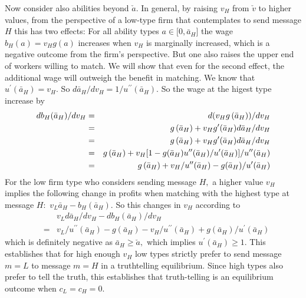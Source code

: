 \documentclass[12pt]{article}
\theoremstyle{plain}
\begin{document}
Now consider also abilities beyond $\check{a}.$ In general, by raising $%
v_{H} $ from $\check{v}$ to higher values, from the perspective of a
low-type firm that contemplates to send message $H$ this has two effects:
For all ability types $a\in \lbrack 0,\bar{a}_{H}]$ the wage $%
b_{H}(a)=v_{H}g(a)$ increases when $v_{H}$ is marginally increased, which is
a negative outcome from the firm's perspective. But one also raises the
upper end of workers willing to match. We will show that even for the second
effect, the additional wage will outweigh the benefit in matching. We know
that $u^{\prime }(\bar{a}_{H})=v_{H}.$ So $d\bar{a}_{H}/dv_{H}=1/u^{\prime
\prime }(\bar{a}_{H}).$ So the wage at the higest type increase by 
\begin{eqnarray*}
db_{H}(\bar{a}_{H})/dv_{H} &=&d(v_{H}g\left( \bar{a}_{H}\right) )/dv_{H} \\
&=&g\left( \bar{a}_{H}\right) +v_{H}g^{\prime }(\bar{a}_{H})d\bar{a}%
_{H}/dv_{H} \\
&=&g\left( \bar{a}_{H}\right) +v_{H}g^{\prime }(\bar{a}_{H})d\bar{a}%
_{H}/dv_{H} \\
&=&g\left( \bar{a}_{H}\right) +v_{H}[1-g(\bar{a}_{H})u^{\prime \prime }(\bar{%
a}_{H})/u^{\prime }(\bar{a}_{H})]/u^{\prime \prime }(\bar{a}_{H}) \\
&=&g\left( \bar{a}_{H}\right) +v_{H}/u^{\prime \prime }(\bar{a}_{H})-g(\bar{a%
}_{H})/u^{\prime }(\bar{a}_{H})
\end{eqnarray*}%
For the low firm type who considers sending message $H,$ a higher value $%
v_{H}$ implies the following change in profits when matching with the
highest type at message $H:$ $v_{L}\bar{a}_{H}-b_{H}(\bar{a}_{H}).$ So this
changes in $v_{H}$ according to 
\begin{eqnarray*}
&&v_{L}d\bar{a}_{H}/dv_{H}-db_{H}(\bar{a}_{H})/dv_{H} \\
&=&v_{L}/u^{\prime \prime }(\bar{a}_{H})-g\left( \bar{a}_{H}\right)
-v_{H}/u^{\prime \prime }(\bar{a}_{H})+g(\bar{a}_{H})/u^{\prime }(\bar{a}%
_{H})
\end{eqnarray*}%
which is definitely negative as $\bar{a}_{H}\geq \check{a},$ which implies $%
u^{\prime }(\bar{a}_{H})\geq 1.$ This establishes that for high enough $%
v_{H} $ low types strictly prefer to send message $m=L$ to message $m=H$ in
a truthtelling equilibrium. Since high types also prefer to tell the truth,
this establishes that truth-telling is an equilibrium outcome when $%
c_{L}=c_{H}=0.$
\end{document}
